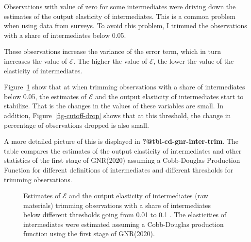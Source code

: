 \documentclass[
  12pt]{article}
\theoremstyle{definition}
\theoremstyle{remark}
\begin{document}
Observations with value of zero for some intermediates were driving down
the estimates of the output elasticity of intermediates. This is a
common problem when using data from surveys. To avoid this problem, I
trimmed the observations with a share of intermediates below 0.05.

These observations increase the variance of the error term, which in
turn increases the value of \(\mathcal{E}\). The higher the value of
\(\mathcal{E}\), the lower the value of the elasticity of intermediates.

Figure~\ref{fig-cutoff} show that at when trimming observations with a
share of intermediates below 0.05, the estimates of \(\mathcal{E}\) and
the output elasticity of intermediates start to stabilize. That is the
changes in the values of these variables are small. In addition,
Figure~\ref{fig-cutoff-drop} shows that at this threshold, the change in
percentage of observations dropped is also small.

A more detailed picture of this is displayed in
\textbf{?@tbl-cd-gnr-inter-trim}. The table compares the estimates of
the output elasticity of intermediates and other statistics of the first
stage of GNR(2020) assuming a Cobb-Douglas Production Function for
different definitions of intermediates and different thresholds for
trimming observations.

\begin{figure}


\caption{\label{fig-cutoff}Estimates of \(\mathcal{E}\) and the output
elasticity of intermediates (raw materials) trimming observations with a
share of intermediates below different thresholds going from 0.01 to 0.1
. The elasticities of intermediates were estimated assuming a
Cobb-Douglas production function using the first stage of GNR(2020).}

\end{figure}%
\end{document}
